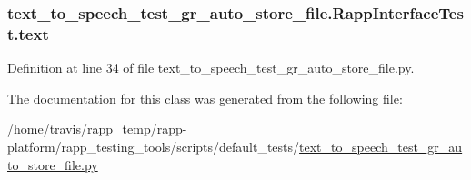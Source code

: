 \hypertarget{classtext__to__speech__test__gr__auto__store__file_1_1RappInterfaceTest_a14c2256010240b7ad878cd6f6504bef3}{
\subsubsection[{text}]{\setlength{\rightskip}{0pt plus 5cm}text\-\_\-to\-\_\-speech\-\_\-test\-\_\-gr\-\_\-auto\-\_\-store\-\_\-file.\-Rapp\-Interface\-Test.\-text}}\label{classtext__to__speech__test__gr__auto__store__file_1_1RappInterfaceTest_a14c2256010240b7ad878cd6f6504bef3}


Definition at line 34 of file text\-\_\-to\-\_\-speech\-\_\-test\-\_\-gr\-\_\-auto\-\_\-store\-\_\-file.\-py.



The documentation for this class was generated from the following file\-:\begin{DoxyCompactItemize}
\item 
/home/travis/rapp\-\_\-temp/rapp-\/platform/rapp\-\_\-testing\-\_\-tools/scripts/default\-\_\-tests/\hyperlink{text__to__speech__test__gr__auto__store__file_8py}{text\-\_\-to\-\_\-speech\-\_\-test\-\_\-gr\-\_\-auto\-\_\-store\-\_\-file.\-py}\end{DoxyCompactItemize}
